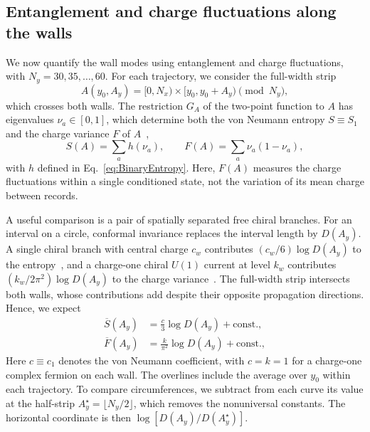 \documentclass[aps,prb,10pt,twocolumn,superscriptaddress,longbibliography,floatfix]{revtex4-2}
\newcommand{\newtext}[1]{{\color{blue}#1}}
\begin{document}
\subsection{Entanglement and charge fluctuations along the walls}
\label{sec:Entanglement}

{\color{blue}
We now quantify the wall modes using entanglement and charge fluctuations, with $N_y=30,35,\ldots,60$. For each trajectory, we consider the full-width strip
\begin{equation}
    A(y_0,A_y)=[0,N_x)\times[y_0,y_0+A_y)\pmod{N_y},
    \label{eq:Strip}
\end{equation}
which crosses both walls. The restriction $G_A$ of the two-point function to $A$ has eigenvalues $\nu_a\in[0,1]$, which determine both the von Neumann entropy $S\equiv S_1$ and the charge variance $F$ of $A$~\cite{KlichLevitov2009,SongFlindtRachel2011},
\begin{equation}
    S(A)=\sum_a h(\nu_a),
    \qquad
    F(A)=\sum_a\nu_a(1-\nu_a),
    \label{eq:EntropyVariance}
\end{equation}
\newtext{with $h$ defined in Eq.~\eqref{eq:BinaryEntropy}.}
Here, $F(A)$ measures the charge fluctuations within a single conditioned state, not the variation of its mean charge between records.
}

{\color{blue}
\newtext{A useful comparison is a pair of spatially separated free chiral branches.} For an interval on a circle, conformal invariance replaces the interval length by $D(A_y)$. A single chiral branch with central charge $c_w$ contributes $(c_w/6)\log D(A_y)$ to the entropy~\cite{CalabreseCardy2004}, and a charge-one chiral $U(1)$ current at level $k_w$ contributes $(k_w/2\pi^2)\log D(A_y)$ to the charge variance~\cite{DiFrancescoMathieuSenechal1997}. The full-width strip intersects both walls, whose contributions add despite their opposite propagation directions. Hence, we expect
\begin{align}
    \overline{S}(A_y)&=\frac{c}{3}\log D(A_y)+\text{const.},\nonumber\\
    \overline{F}(A_y)&=\frac{k}{\pi^2}\log D(A_y)+\text{const.},
    \label{eq:CFTScaling}
\end{align}
\newtext{Here $c\equiv c_1$ denotes the von Neumann coefficient, with $c=k=1$ for a charge-one complex fermion on each wall.} \newtext{The overlines include the average over $y_0$ within each trajectory.} To compare circumferences, we subtract from each curve its value at the half-strip $A_y^\star=\lfloor N_y/2\rfloor$, which removes the nonuniversal constants. The horizontal coordinate is then $\log[D(A_y)/D(A_y^\star)]$.
}
\end{document}
